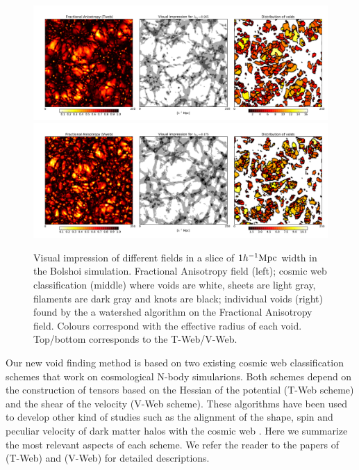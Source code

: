 \documentclass[a4,useAMS,usenatbib,usegraphicx]{mn2e}
\newcommand{\hMpc}{{\ifmmode{h^{-1}{\rm Mpc}}\else{$h^{-1}$Mpc}\fi}}
\begin{document}
\begin{figure}
  \includegraphics[trim = 16mm 8mm 5mm 12mm, clip, keepaspectratio=true,
  width=0.73\textheight]{cosmicweb_FA_Tweb.pdf}
  \includegraphics[trim = 16mm 8mm 5mm 12mm, clip, keepaspectratio=true,
  width=0.73\textheight]{cosmicweb_FA_Vweb.pdf}
  \caption{Visual impression of different fields in a slice of
    $1\hMpc$ width in the Bolshoi simulation.   
    Fractional Anisotropy field (left); cosmic web classification
    (middle) where voids are white, sheets are light gray, filaments
    are dark gray and knots are black; individual voids (right) found by 
    the a watershed algorithm on the Fractional Anisotropy field. Colours
    correspond with the effective radius of each void. Top/bottom
    corresponds to the T-Web/V-Web.}
  \label{fig:FA_field}
\end{figure}

Our new void finding method is based on two existing cosmic web
classification schemes that work on cosmological N-body simularions.
Both schemes depend on the construction of tensors based on the
Hessian of the potential (T-Web scheme) and the shear of the velocity
(V-Web scheme). 
These algorithms have been used to develop other
kind of studies such as the alignment of the shape, spin and peculiar
velocity of dark matter halos with the cosmic web
\citep{Libeskind13,Forero2014}. 
Here we summarize the most relevant aspects of each scheme. 
We refer the reader to the papers of \cite{Forero09} (T-Web) and
\cite{Hoffman12} (V-Web) for detailed descriptions.  
\end{document}
